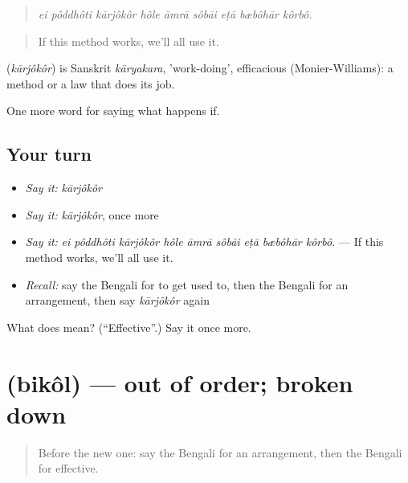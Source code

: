 \begin{quote}
\emph{ei pôddhôti kārjôkôr hôle āmrā sôbāi eṭā bæbôhār kôrbô.}
\end{quote}

\begin{quote}
If this method works, we'll all use it.
\end{quote}

\begin{cousinweb}
\textbf{} (\emph{kārjôkôr}) is Sanskrit \emph{kāryakara}, 'work-doing', efficacious (Monier-Williams): a method or a law that does its job.
\end{cousinweb}

\begin{grammarlens}[title={What you've built}]
One more word for saying what happens if.
\end{grammarlens}

\subsection*{Your turn}
\begin{itemize}
\raggedright
  \item \emph{Say it:} \emph{kārjôkôr}
  \item \emph{Say it:} \emph{kārjôkôr}, once more
  \item \emph{Say it:} \emph{ei pôddhôti kārjôkôr hôle āmrā sôbāi eṭā bæbôhār kôrbô.} — If this method works, we'll all use it.
  \item \emph{Recall:} say the Bengali for to get used to, then the Bengali for an arrangement, then say \emph{kārjôkôr} again
\end{itemize}

\begin{tcolorbox}[breakable,colback=teal!4,colframe=teal!35!black,title={Before you move on}]
What does  mean? (\textquotedblleft{}Effective\textquotedblright{}.) Say it once more.
\end{tcolorbox}
\section[\texorpdfstring{\bn{বিকল} (bikôl)}{বিকল (bikôl)}]{ (bikôl) — out of order; broken down}

\label{lesson:BN-C381-bikol}



\begin{quote}
Before the new one: say the Bengali for an arrangement, then the Bengali for effective.
\end{quote}

